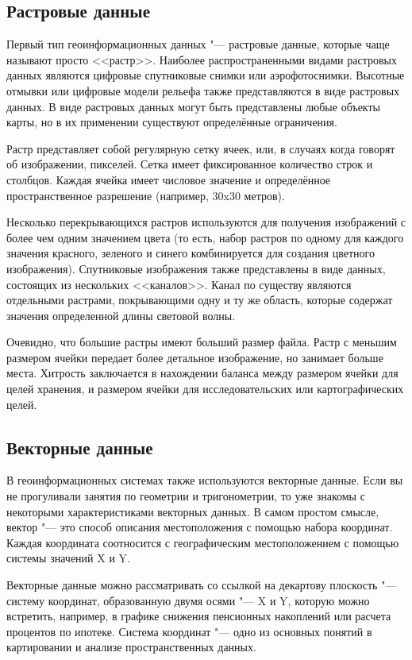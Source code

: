 \subsection{Растровые данные}\label{label_rasterdata}

Первый тип геоинформационных данных "--- растровые данные, которые чаще называют
просто <<растр>>. Наиболее распространенными видами растровых данных являются цифровые спутниковые снимки или аэрофотоснимки. Высотные отмывки или цифровые модели рельефа также
представляются в виде растровых данных. В виде растровых данных могут быть
представлены любые объекты карты, но в их применении существуют определённые
ограничения.

Растр представляет собой регулярную сетку ячеек, или, в случаях когда
говорят об изображении, пикселей. Сетка имеет фиксированное количество
строк и столбцов. Каждая ячейка имеет числовое значение и определённое
пространственное разрешение (например, 30x30 метров).

Несколько перекрывающихся растров используются для получения изображений
с более чем одним значением цвета (то есть, набор растров по одному для каждого
значения красного, зеленого и синего комбинируется для создания
цветного изображения). Спутниковые изображения также представлены в виде данных,
состоящих из нескольких <<каналов>>. Канал по существу являются отдельными растрами,
покрывающими одну и ту же область, которые содержат значения определенной
длины световой волны.

Очевидно, что большие растры имеют больший размер файла. Растр с меньшим
размером ячейки передает более детальное изображение, но занимает больше места.
Хитрость заключается в нахождении баланса между размером ячейки для целей
хранения, и размером ячейки для исследовательских или картографических целей.

\subsection{Векторные данные}\label{label_vectordata}

В геоинформационных системах также используются векторные данные. Если
вы не прогуливали занятия по геометрии и тригонометрии, то уже знакомы
с некоторыми характеристиками векторных данных. В самом простом смысле,
вектор "--- это способ описания местоположения с помощью набора координат.
Каждая координата соотносится с географическим местоположением с помощью
системы значений X и Y.

Векторные данные можно рассматривать со ссылкой на декартову плоскость
"--- систему координат, образованную двумя осями "--- X и Y, которую можно встретить,
например, в графике снижения пенсионных накоплений или расчета процентов по ипотеке.
Система координат "--- одно из основных понятий в картировании и анализе пространственных
данных.

